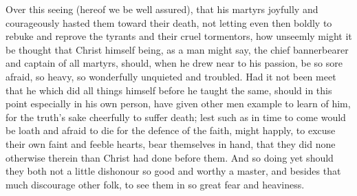 \documentclass[a5paper]{scrbook}
\begin{document}
	Over this seeing (hereof we be well assured), that his martyrs joyfully and courageously hasted them toward their death, not letting even then boldly to rebuke and reprove the tyrants and their cruel tormentors, how unseemly might it be thought that Christ himself being, as a man might say, the chief bannerbearer and captain of all martyrs, should, when he drew near to his passion, be so sore afraid, so heavy, so wonderfully unquieted and troubled. Had it not been meet that he which did all things himself before he taught the same, should in this point especially in his own person, have given other men example to learn of him, for the truth's sake cheerfully to suffer death; lest such as in time to come would be loath and afraid to die for the defence of the faith, might happly, to excuse their own faint and feeble hearts, bear themselves in hand, that they did none otherwise therein than Christ had done before them. And so doing yet should they both not a little dishonour so good and worthy a master, and besides that much discourage other folk, to see them in so great fear and heaviness.
	
	
\end{document}

